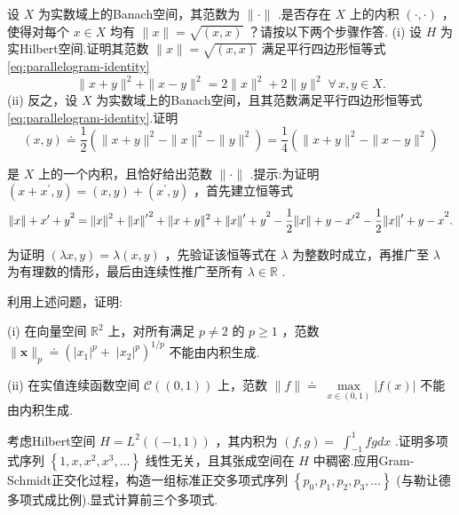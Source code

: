 \begin{rbhw}
设 $X$ 为实数域上的Banach空间，其范数为 $\|  \cdot  \|$ .是否存在 $X$ 上的内积 $\left( {\cdot , \cdot  }\right)$ ，使得对每个 $x \in  X$ 均有 $\| x\|  = \sqrt{\left( x,x\right) }$ ？请按以下两个步骤作答.
(i) 设 $H$ 为实Hilbert空间.证明其范数 $\| x\|  = \sqrt{\left( x,x\right) }$ 满足平行四边形恒等式\eqref{eq:parallelogram-identity}
\begin{equation}\tag{5.28}\label{eq:parallelogram-identity}
\| x + y{\| }^{2} + \| x - y{\| }^{2} = 2\| x{\| }^{2} + 2\| y{\| }^{2}\;\forall\,x,y \in  X.
\end{equation}
(ii) 反之，设 $X$ 为实数域上的Banach空间，且其范数满足平行四边形恒等式\eqref{eq:parallelogram-identity}.证明
\[
\left( {x,y}\right)  \doteq  \frac{1}{2}\left( {\| x + y{\| }^{2} - \| x{\| }^{2} - \| y{\| }^{2}}\right)  = \frac{1}{4}\left( {\| x + y{\| }^{2} - \| x - y{\| }^{2}}\right)
\]

是 $X$ 上的一个内积，且恰好给出范数 $\|  \cdot  \|$ .提示:为证明 $\left( {x + {x}^{\prime },y}\right)  = \left( {x,y}\right)  + \left( {{x}^{\prime },y}\right)$ ，首先建立恒等式
\[
{\norm{x} + {x}^{\prime } + y}^{2} = {\norm{x}}^{2} + {\norm{x}^{\prime }}^{2} + \| x + y{\| }^{2} + {\norm{x}^{\prime } + y}^{2} - \frac{1}{2}{\norm{x} + y - {x}^{\prime }}^{2} - \frac{1}{2}{\norm{x}^{\prime } + y - x}^{2}.
\]

为证明 $\left( {{\lambda x},y}\right)  = \lambda \left( {x,y}\right)$ ，先验证该恒等式在 $\lambda$ 为整数时成立，再推广至 $\lambda$ 为有理数的情形，最后由连续性推广至所有 $\lambda  \in  \mathbb{R}$ .
\end{rbhw}

\begin{rbhw}
利用上述问题，证明:

(i) 在向量空间 ${\mathbb{R}}^{2}$ 上，对所有满足 $p \neq  2$ 的 $p \geq  1$ ，范数 $\| \bm{x}{\| }_{p} \doteq  \left( {{\left| {x}_{1}\right| }^{p} + }\right. \; {\left. {\left| {x}_{2}\right| }^{p}\right) }^{1/p}$ 不能由内积生成.

(ii) 在实值连续函数空间 $\mathcal{C}\left( \left(  {0,1}\right)  \right)$ 上，范数 $\| f\|  \doteq \; \mathop{\max }\limits_{{x \in  \left(  {0,1}\right)  }}\left| {f\left( x\right) }\right|$ 不能由内积生成.
\end{rbhw}

\begin{rbhw}
考虑Hilbert空间 $H = {L}^{2}\left( \left(  {-1,1}\right)  \right)$ ，其内积为 $\left( {f,g}\right)  = \; {\int }_{-1}^{1}{fgdx}$ .证明多项式序列 $\left\{  {1,x,{x}^{2},{x}^{3},\ldots }\right\}$ 线性无关，且其张成空间在 $H$ 中稠密.应用Gram-Schmidt正交化过程，构造一组标准正交多项式序列 $\left\{  {{p}_{0},{p}_{1},{p}_{2},{p}_{3},\ldots }\right\}$ (与勒让德多项式成比例).显式计算前三个多项式.
\end{rbhw}

